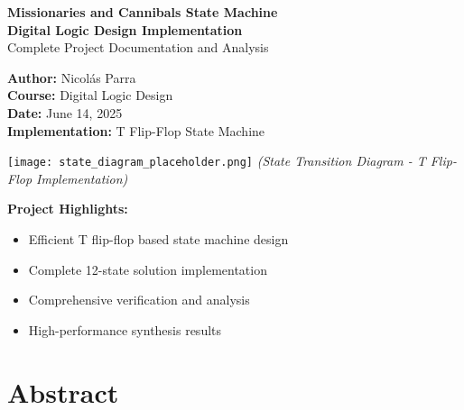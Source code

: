 \documentclass[12pt,letterpaper]{article}
\begin{document}
\begin{titlepage}
    \centering
    \vspace*{2cm}
    
    {\Huge\bfseries Missionaries and Cannibals State Machine\\}
    \vspace{0.5cm}
    {\Large\bfseries Digital Logic Design Implementation\\}
    \vspace{0.3cm}
    {\large Complete Project Documentation and Analysis\\}
    
    \vspace{2cm}
    
    {\Large\textbf{Author:} Nicolás Parra\\}
    \vspace{0.5cm}
    {\Large\textbf{Course:} Digital Logic Design\\}
    \vspace{0.5cm}
    {\Large\textbf{Date:} June 14, 2025\\}
    \vspace{0.5cm}
    {\Large\textbf{Implementation:} T Flip-Flop State Machine\\}
    
    \vfill
    
    \texttt{[image: state\_diagram\_placeholder.png]}
    \textit{(State Transition Diagram - T Flip-Flop Implementation)}
    
    \vfill
    
    {\large\textbf{Project Highlights:}}
    \begin{itemize}
        \item Efficient T flip-flop based state machine design
        \item Complete 12-state solution implementation
        \item Comprehensive verification and analysis
        \item High-performance synthesis results
    \end{itemize}
    
\end{titlepage}

\tableofcontents
\newpage

\section*{Abstract}
\end{document}
